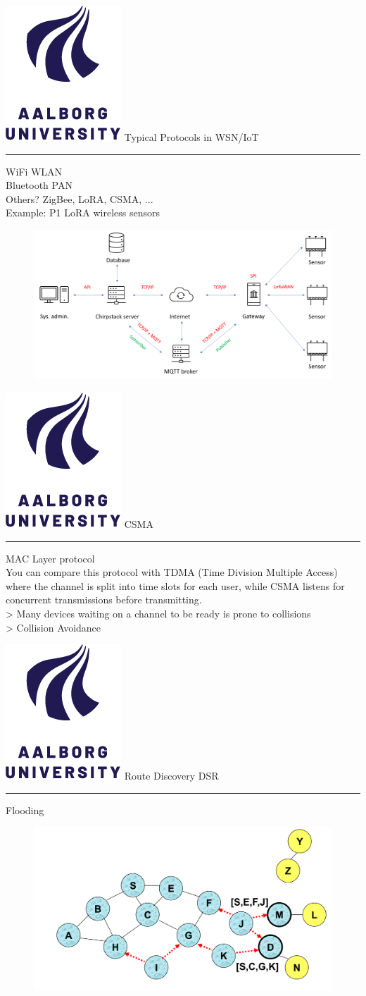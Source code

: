 \documentclass[aspectratio=1610,17pt,utf8]{beamer}
\newcommand{\regularframe}[1]{\color{black}\includegraphics[width=.05\textwidth]{figures/aau.png} #1\\\hrule}
\begin{document}
\begin{frame}{\regularframe{Typical Protocols in WSN/IoT}}
    WiFi WLAN\\
    Bluetooth PAN\\
    Others? ZigBee, LoRA, CSMA, ...\\
    Example: P1 LoRA wireless sensors\\
    \begin{figure}
        \includegraphics[width=.6\textwidth]{figures/system_oversigt.png}
    \end{figure}
\end{frame}

\begin{frame}{\regularframe{CSMA}}
    MAC Layer protocol\\
    You can compare this protocol with TDMA (Time Division Multiple Access) where the channel is split into time slots for each user, while CSMA listens for concurrent transmissions before transmitting.\\
    > Many devices waiting on a channel to be ready is prone to collisions\\
    > Collision Avoidance %
\end{frame}

\begin{frame}{\regularframe{Route Discovery DSR}}
    Flooding\\
    \begin{figure}
        \includegraphics[width=.9\textwidth]{figures/route-discovery.png}
    \end{figure}
\end{frame}
\end{document}
